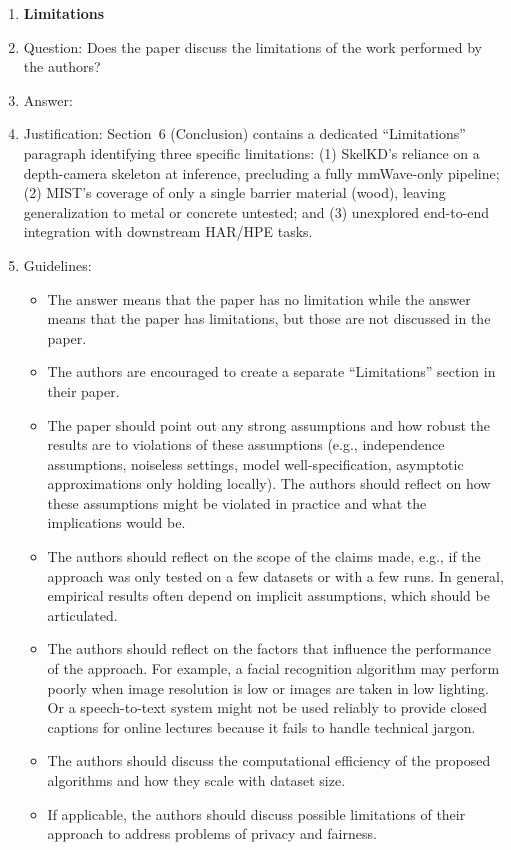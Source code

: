 \begin{enumerate}
\item {\bf Limitations}
    \item[] Question: Does the paper discuss the limitations of the work performed by the authors?
    \item[] Answer: \answerYes{}
    \item[] Justification: Section~6 (Conclusion) contains a dedicated ``Limitations'' paragraph identifying three specific limitations: (1) SkelKD's reliance on a depth-camera skeleton at inference, precluding a fully mmWave-only pipeline; (2) MIST's coverage of only a single barrier material (wood), leaving generalization to metal or concrete untested; and (3) unexplored end-to-end integration with downstream HAR/HPE tasks.
    \item[] Guidelines:
    \begin{itemize}
        \item The answer \answerNA{} means that the paper has no limitation while the answer \answerNo{} means that the paper has limitations, but those are not discussed in the paper.
        \item The authors are encouraged to create a separate ``Limitations'' section in their paper.
        \item The paper should point out any strong assumptions and how robust the results are to violations of these assumptions (e.g., independence assumptions, noiseless settings, model well-specification, asymptotic approximations only holding locally). The authors should reflect on how these assumptions might be violated in practice and what the implications would be.
        \item The authors should reflect on the scope of the claims made, e.g., if the approach was only tested on a few datasets or with a few runs. In general, empirical results often depend on implicit assumptions, which should be articulated.
        \item The authors should reflect on the factors that influence the performance of the approach. For example, a facial recognition algorithm may perform poorly when image resolution is low or images are taken in low lighting. Or a speech-to-text system might not be used reliably to provide closed captions for online lectures because it fails to handle technical jargon.
        \item The authors should discuss the computational efficiency of the proposed algorithms and how they scale with dataset size.
        \item If applicable, the authors should discuss possible limitations of their approach to address problems of privacy and fairness.

\end{itemize}
\end{enumerate}
